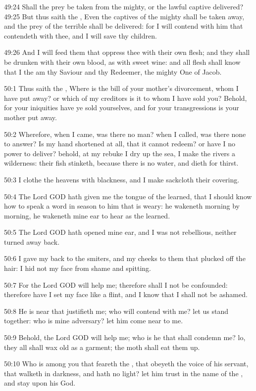 49:24 Shall the prey be taken from the mighty, or the lawful captive delivered?  49:25 But thus saith the \LORD, Even the captives of the mighty shall be taken away, and the prey of the terrible shall be delivered: for I will contend with him that contendeth with thee, and I will save thy children.

49:26 And I will feed them that oppress thee with their own flesh; and they shall be drunken with their own blood, as with sweet wine: and all flesh shall know that I the \LORD am thy Saviour and thy Redeemer, the mighty One of Jacob.

50:1 Thus saith the \LORD, Where is the bill of your mother's divorcement, whom I have put away? or which of my creditors is it to whom I have sold you?  Behold, for your iniquities have ye sold yourselves, and for your transgressions is your mother put away.

50:2 Wherefore, when I came, was there no man? when I called, was there none to answer? Is my hand shortened at all, that it cannot redeem? or have I no power to deliver? behold, at my rebuke I dry up the sea, I make the rivers a wilderness: their fish stinketh, because there is no water, and dieth for thirst.

50:3 I clothe the heavens with blackness, and I make sackcloth their covering.

50:4 The Lord GOD hath given me the tongue of the learned, that I should know how to speak a word in season to him that is weary: he wakeneth morning by morning, he wakeneth mine ear to hear as the learned.

50:5 The Lord GOD hath opened mine ear, and I was not rebellious, neither turned away back.

50:6 I gave my back to the smiters, and my cheeks to them that plucked off the hair: I hid not my face from shame and spitting.

50:7 For the Lord GOD will help me; therefore shall I not be confounded: therefore have I set my face like a flint, and I know that I shall not be ashamed.

50:8 He is near that justifieth me; who will contend with me? let us stand together: who is mine adversary? let him come near to me.

50:9 Behold, the Lord GOD will help me; who is he that shall condemn me?  lo, they all shall wax old as a garment; the moth shall eat them up.

50:10 Who is among you that feareth the \LORD, that obeyeth the voice of his servant, that walketh in darkness, and hath no light? let him trust in the name of the \LORD, and stay upon his God.


